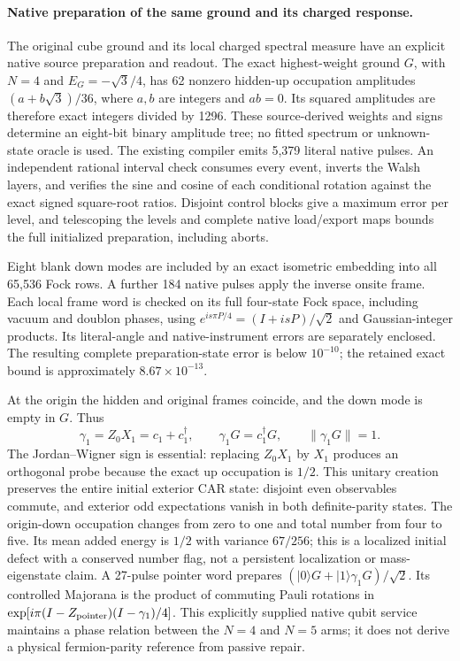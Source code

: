 \paragraph{Native preparation of the same ground and its charged response.}
The original cube ground and its local charged spectral measure have
an explicit native source preparation and readout.  The exact
highest-weight ground $G$, with $N=4$ and $E_G=-\sqrt3/4$, has 62 nonzero
hidden-up occupation amplitudes $(a+b\sqrt3)/36$, where $a,b$ are integers
and $ab=0$.  Its squared amplitudes are therefore exact integers divided
by 1296.  These source-derived weights and signs determine an eight-bit
binary amplitude tree; no fitted spectrum or unknown-state oracle is used.
The existing compiler emits 5,379 literal native pulses.  An independent
rational interval check consumes every event, inverts the Walsh layers,
and verifies the sine and cosine of each conditional rotation against
the exact signed square-root ratios.  Disjoint control blocks give a
maximum error per level, and telescoping the levels and complete native
load/export maps bounds the full initialized preparation, including aborts.

Eight blank down modes are included by an exact isometric embedding into
all 65,536 Fock rows.  A further 184 native pulses apply the inverse
onsite frame.  Each local frame word is checked on its full four-state
Fock space, including vacuum and doublon phases, using
$e^{is\pi P/4}=(I+isP)/\sqrt2$ and Gaussian-integer products.
Its literal-angle and native-instrument errors are separately enclosed.
The resulting complete preparation-state error is below $10^{-10}$;
the retained exact bound is approximately $8.67\times10^{-13}$.

At the origin the hidden and original frames coincide, and the down
mode is empty in $G$.  Thus
\[
\gamma_1=Z_0X_1=c_1+c_1^\dagger,
\qquad \gamma_1G=c_1^\dagger G,
\qquad \|\gamma_1G\|=1.
\]
The Jordan--Wigner sign is essential: replacing $Z_0X_1$ by $X_1$
produces an orthogonal probe because the exact up occupation is $1/2$.
This unitary creation preserves the entire initial exterior CAR state:
disjoint even observables commute, and exterior odd expectations vanish
in both definite-parity states.  The origin-down occupation changes from
zero to one and total number from four to five.  Its mean added energy
is $1/2$ with variance $67/256$; this is a localized initial defect with a
conserved number flag, not a persistent localization or mass-eigenstate
claim.
A 27-pulse pointer word prepares
$(|0\rangle G+|1\rangle\gamma_1G)/\sqrt2$.
Its controlled Majorana is the product of commuting Pauli rotations in
$\exp[i\pi(I-Z_{\rm pointer})(I-\gamma_1)/4]$.
This explicitly supplied native qubit service maintains a phase relation
between the $N=4$ and $N=5$ arms; it does not derive a physical
fermion-parity reference from passive repair.

